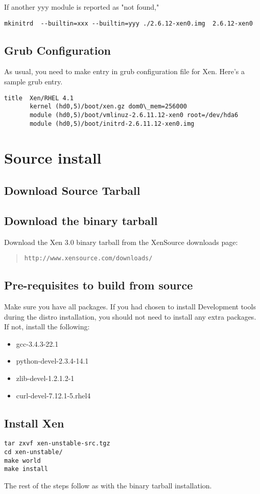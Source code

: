 If another yyy module is reported as "not found,"

\begin{verbatim}
mkinitrd  --builtin=xxx --builtin=yyy ./2.6.12-xen0.img  2.6.12-xen0
\end{verbatim}

\subsection{Grub Configuration}

As usual, you need to make entry in grub configuration file for Xen. Here's a sample grub entry.

{\small
\begin{verbatim}
title  Xen/RHEL 4.1
       kernel (hd0,5)/boot/xen.gz dom0\_mem=256000
       module (hd0,5)/boot/vmlinuz-2.6.11.12-xen0 root=/dev/hda6
       module (hd0,5)/boot/initrd-2.6.11.12-xen0.img
\end{verbatim}
}

\section{Source install}


\subsection{Download Source Tarball}

\subsection{Download the binary tarball}
Download the Xen 3.0 binary tarball from the XenSource downloads page:

\begin{quote} {\tt http://www.xensource.com/downloads/}
\end{quote}

\subsection{Pre-requisites to build from source}

Make sure you have all packages. If you had chosen to install Development tools during the distro installation, you should not need to install any extra packages. If not, install the following:

\begin{itemize}
\item gcc-3.4.3-22.1
\item python-devel-2.3.4-14.1
\item zlib-devel-1.2.1.2-1
\item curl-devel-7.12.1-5.rhel4
\end{itemize}

\subsection{Install Xen}

\begin{verbatim}
tar zxvf xen-unstable-src.tgz
cd xen-unstable/
make world
make install
\end{verbatim}

The rest of the steps follow as with the binary tarball installation.
